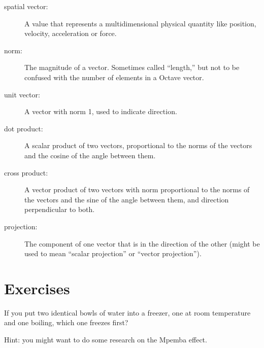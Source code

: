 \documentclass{book}
\begin{document}
\begin{description}

\item[spatial vector:] A value that represents a
multidimensional physical quantity like position, velocity,
acceleration or force.

\item[norm:] The magnitude of a vector. Sometimes called ``length,''
but not to be confused with the number of elements in a Octave
vector.

\item[unit vector:] A vector with norm 1, used to indicate
direction.

\item[dot product:] A scalar product of two vectors, proportional
to the norms of the vectors and the cosine of the angle between them.

\item[cross product:] A vector product of two vectors with norm
proportional to the norms of the vectors and the sine of the angle
between them, and direction perpendicular to both.

\item[projection:] The component of one vector that is in the
direction of the other (might be used to mean ``scalar projection'' or
``vector projection'').

\end{description}


\section{Exercises}

\begin{ex}
If you put two identical bowls of water into a freezer, one at
room temperature and one boiling, which one freezes first?

Hint: you might want to do some research on the Mpemba effect.

\end{ex}
\end{document}
